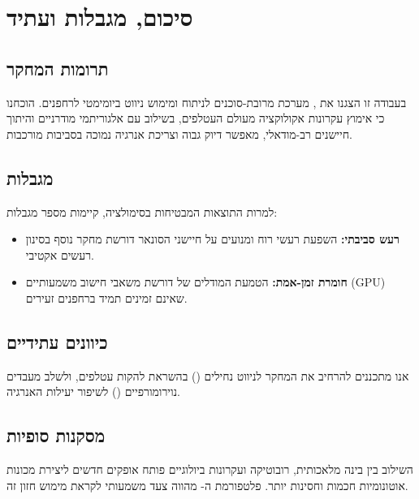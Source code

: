 
\section{סיכום, מגבלות ועתיד}
\label{sec:conclusion}

\subsection{תרומות המחקר}
בעבודה זו הצגנו את , מערכת מרובת-סוכנים לניתוח ומימוש ניווט ביומימטי לרחפנים. הוכחנו כי אימוץ עקרונות אקולוקציה מעולם העטלפים, בשילוב עם אלגוריתמי  מודרניים והיתוך חיישנים רב-מודאלי, מאפשר דיוק גבוה וצריכת אנרגיה נמוכה בסביבות מורכבות.

\subsection{מגבלות}
למרות התוצאות המבטיחות בסימולציה, קיימות מספר מגבלות:
\begin{itemize}
    \item \textbf{רעש סביבתי:} השפעת רעשי רוח ומנועים על חיישני הסונאר דורשת מחקר נוסף בסינון רעשים אקטיבי.
    \item \textbf{חומרת זמן-אמת:} הטמעת המודלים של  דורשת משאבי חישוב משמעותיים (GPU) שאינם זמינים תמיד ברחפנים זעירים.
\end{itemize}

\subsection{כיוונים עתידיים}
אנו מתכננים להרחיב את המחקר לניווט נחילים () בהשראת להקות עטלפים, ולשלב מעבדים נוירומורפיים () לשיפור יעילות האנרגיה.

\subsection{מסקנות סופיות}
השילוב בין בינה מלאכותית, רובוטיקה ועקרונות ביולוגיים פותח אופקים חדשים ליצירת מכונות אוטונומיות חכמות וחסינות יותר. פלטפורמת ה- מהווה צעד משמעותי לקראת מימוש חזון זה.
